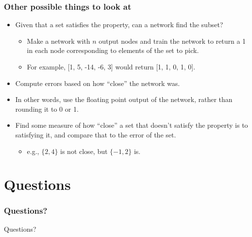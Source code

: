 \documentclass{beamer}
\numberwithin{equation}{section} %
\begin{document}
\begin{frame}
    \frametitle{Other possible things to look at}
    \begin{itemize}
        \item Given that a set satisfies the property, can a network find the subset?
        \pause
        \begin{itemize}
            \item Make a network with $n$ output nodes and train the network to return a 1 in each node corresponding to elements of the set to pick.
            \pause
            \item For example, [1, 5, -14, -6, 3] would return [1, 1, 0, 1, 0].
        \end{itemize}
        \pause
        \item Compute errors based on how ``close'' the network was.
        \item In other words, use the floating point output of the network, rather than rounding it to 0 or 1.
        \pause
        \item Find some measure of how ``close'' a set that doesn't satisfy the property is to satisfying it, and compare that to the error of the set.
        \begin{itemize}
            \item e.g., $\{2, 4\}$ is not close, but $\{-1, 2\}$ is.
        \end{itemize}
    \end{itemize}
\end{frame}

\section{Questions}

\begin{frame}
    \frametitle{Questions?}
    \huge{Questions?}
\end{frame}
\end{document}
